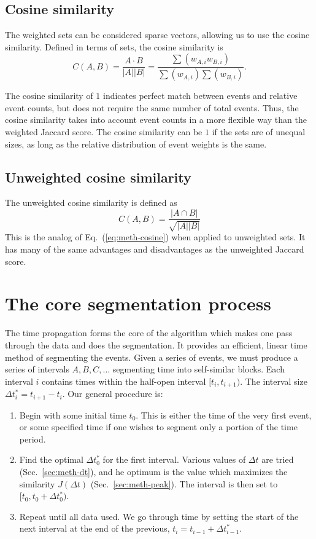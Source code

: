 \documentclass[draft]{article}
\begin{document}
\subsection{Cosine similarity}
The weighted sets can be considered sparse vectors,
allowing us to use the cosine similarity.  Defined in terms of sets, the
cosine similarity is
\begin{equation}
  C(A,B)
    = \frac{ A \cdot B }{ |A| |B| }
    = \frac{ \sum(w_{A,i}  w_{B,i}) }{ \sum(w_{A,i}) \sum(w_{B,i}) }.
    \label{eq:meth-cosine}
\end{equation}

The cosine similarity of $1$ indicates perfect match between events
and relative event counts, but does not require the same number of
total events.
Thus, the cosine similarity takes into account event counts in a more
flexible way than the weighted Jaccard score.  The cosine similarity can
be $1$ if the sets are of unequal sizes, as long as the relative
distribution of event weights is the same.


\subsection{Unweighted cosine similarity}
The unweighted cosine similarity is defined as
\begin{equation}
  C(A,B) = \frac{|A \cap B|}{\sqrt{ |A| |B| }}
\end{equation}
This is the analog of Eq.~(\ref{eq:meth-cosine}) when applied to
unweighted sets.  It has many of the same advantages and disadvantages
as the unweighted Jaccard score.


\section{The core segmentation process}
\label{sec:meth-time}
The time propagation forms the core of the algorithm which makes one
pass through the data and does the segmentation.  It provides an
efficient, linear time method of segmenting the events.  Given a
series of events, we must produce a series of intervals $A, B, C, \ldots$ segmenting time into
self-similar blocks.  Each interval $i$ contains times within the
half-open interval $[t_{i}, t_{i+1})$.  The interval size $\Delta t^*_i =
t_{i+1}-t_{i}$.  Our general procedure is:
\begin{enumerate}
\item Begin with some initial time $t_0$.  This is either the time of
  the very first event, or some specified time if one wishes to
  segment only a portion of the time period.
\item Find the optimal $\Delta t^*_0$ for the first interval.  Various
  values of $\Delta t$ are tried (Sec.~\ref{sec:meth-dt}), and he
  optimum is the value which maximizes the similarity $J(\Delta t)$
  (Sec.~\ref{sec:meth-peak}).  The interval is then set to $[t_0,
  t_0+\Delta t^*_0)$.
\item Repeat until all data used.  We go through time by setting the
  start of the next interval at the end of the previous, $t_i =
  t_{i-1}+\Delta t^*_{i-1}$.
\end{enumerate}
\end{document}
